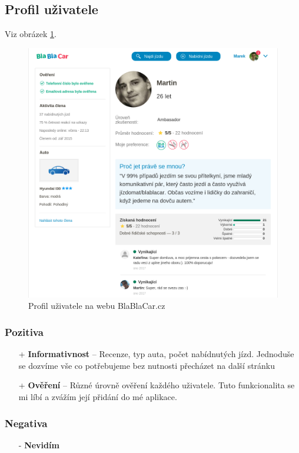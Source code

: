 
\newpage
\subsection{Profil uživatele}
Viz obrázek \ref{fig:blablacar:profile}.
\begin{figure}[h]
    \centering
    \includegraphics[width=1.0\textwidth]{media/blablacar/profile.png}
    \caption{Profil uživatele na webu BlaBlaCar.cz}
    \label{fig:blablacar:profile}
\end{figure}
\subsubsection*{Pozitiva}
\begin{itemize}
    \item[+] \textbf{Informativnost} -- Recenze, typ auta, počet nabídnutých jízd. Jednoduše se dozvíme vše co potřebujeme bez nutnosti přecházet na další stránku
    \item[+] \textbf{Ověření} -- Různé úrovně ověření každého uživatele. Tuto funkcionalita se mi líbí a zvážím její přidání do mé aplikace.
\end{itemize}
\subsubsection*{Negativa}
\begin{itemize}
    \item[-] \textbf{Nevidím}
\end{itemize}


